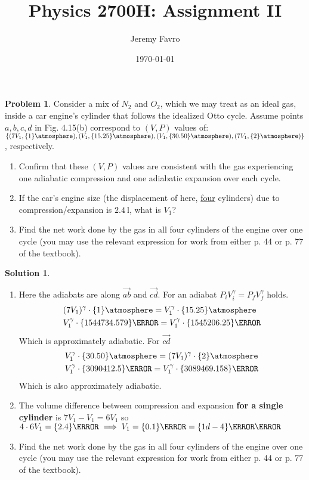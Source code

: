 \documentclass[10pt]{article}
\title{Physics 2700H: Assignment II}
\author{Jeremy Favro}
\date{\today}
\theoremstyle{definition}
\newtheorem{problem}{Problem}
\newtheorem{soln}{Solution}
\begin{document}
\maketitle

\begin{problem}
Consider a mix of $N_2$ and $O_2$, which we may treat as an ideal gas, inside a car engine's cylinder that
follows the idealized Otto cycle. Assume points ${a,b,c,d}$ in Fig. 4.15(b)
correspond to $(V,P)$ values of: $\left\{(7V_1,\qty{1}{\atmosphere}), (V_1, \qty{15.25}{\atmosphere}), (V_1, \qty{30.50}{\atmosphere}), (7V_1, \qty{2}{\atmosphere})\right\}$,
respectively.
\begin{enumerate}[label=(\alph*)]
  \item Confirm that these $(V,P)$ values are consistent with the gas experiencing one adiabatic
        compression and one adiabatic expansion over each cycle.
  \item If the car's engine size (the displacement of here, \underline{four} cylinders) due to compression/expansion is $\qty{2.4}{\litre}$, what is $V_1$?
  \item Find the net work done by the gas in all four cylinders of the engine over one cycle (you may use the relevant expression for work from either p. 44 or p. 77 of the textbook).
\end{enumerate}
\end{problem}
\begin{soln} ~
  \begin{enumerate}[label=(\alph*)]
    \item Here the adiabats are along $\overrightarrow{ab}$ and $\overrightarrow{cd}$. For an adiabat $P_iV_i^\gamma=P_fV_f^\gamma$ holds.
    \begin{align*}
      & (7V_1)^\gamma\cdot\qty{1}{\atmosphere}=V_1^\gamma\cdot\qty{15.25}{\atmosphere}\\
      & V_1^\gamma\cdot\qty{1544734.579}{\pascal}=V_1^\gamma\cdot\qty{1545206.25}{\pascal}
    \end{align*}
    Which is approximately adiabatic. For $\overrightarrow{cd}$
    \begin{align*}
      & V_1^\gamma\cdot\qty{30.50}{\atmosphere}=(7V_1)^\gamma\cdot\qty{2}{\atmosphere}\\
      & V_1^\gamma\cdot\qty{3090412.5}{\pascal}=V_1^\gamma\cdot\qty{3089469.158}{\pascal}
    \end{align*}
    Which is also approximately adiabatic.
    \item The volume difference between compression and expansion \textbf{for a single cylinder} is $7V_1-V_1=6V_1$ so $4\cdot6V_1=\qty{2.4}{\liter}\implies V_1=\qty{0.1}{\liter}=\qty{1d-4}{\meter\cubed}$
    \item Find the net work done by the gas in all four cylinders of the engine over one cycle (you may use the relevant expression for work from either p. 44 or p. 77 of the textbook).
  \end{enumerate}
\end{soln}
\end{document}
